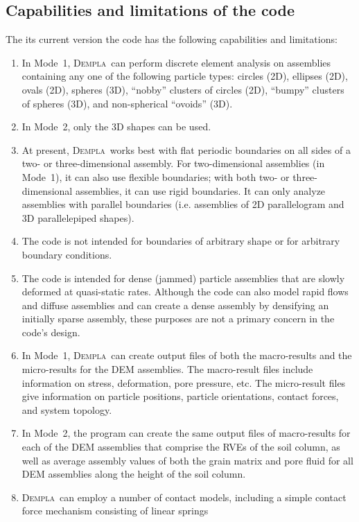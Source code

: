 \documentclass[letterpaper,11pt]{article}
\newcommand{\Dempla}{\textsc{Dempla}}
\begin{document}
\subsection{Capabilities and limitations of the code}\label{sec:CapabilitiesOval}
The its current version the code has the following capabilities and
limitations:
\begin{enumerate}
\item
In Mode~1,
\Dempla\ can perform discrete element 
analysis on assemblies containing any one of the following particle
types:  circles (2D), ellipses (2D), ovals (2D), spheres (3D),
``nobby'' clusters of circles (2D),
``bumpy'' clusters of spheres (3D),
and non-spherical ``ovoids'' (3D).
\item
In Mode~2, only the 3D shapes can be used.
\item
At present, \Dempla\ works best with flat periodic boundaries 
on all sides of a two- or three-dimensional assembly.
For two-dimensional assemblies (in Mode~1),
it can also use flexible boundaries;
with both two- or three-dimensional assemblies,
it can use rigid boundaries.
It can only analyze assemblies with parallel boundaries
(i.e. assemblies of 2D parallelogram and 3D parallelepiped shapes).
\item
The code is not intended for boundaries of arbitrary shape
or for arbitrary boundary conditions.
\item
The code is intended for dense (jammed) particle assemblies
that are slowly deformed at quasi-static rates.
Although the code can also model rapid flows and diffuse
assemblies and can create a dense assembly by
densifying an initially sparse assembly,
these purposes are not a primary concern in
the code's design.
\item
In Mode~1,
\Dempla\ can create output files of both the
macro-results and the micro-results
for the DEM assemblies.
The macro-result files include information on stress, deformation,
pore pressure, etc.
The micro-result files give information on particle positions, particle 
orientations, contact forces, and system topology.
\item
In Mode~2,
the program can create the same output files of macro-results
for each of the
DEM assemblies that comprise the RVEs of the soil column,
as well as average assembly
values of both the grain matrix and pore fluid for all
DEM assemblies along the height of the soil column.
\item
\Dempla\ can employ a number of contact models,
including a
simple contact force mechanism consisting of linear springs 

\end{enumerate}
\end{document}

